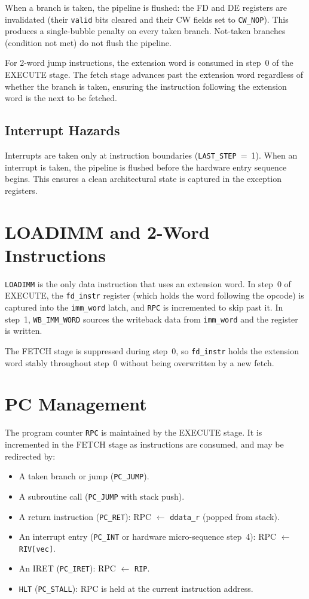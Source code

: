 \documentclass[a4paper,12pt]{report}
\newcommand{\asm}[1]{\texttt{#1}}
\newcommand{\field}[1]{\texttt{\small #1}}
\begin{document}
When a branch is taken, the pipeline is flushed: the FD and DE registers are invalidated (their \field{valid} bits cleared and their CW fields set to \field{CW\_NOP}). This produces a single-bubble penalty on every taken branch. Not-taken branches (condition not met) do not flush the pipeline.

For 2-word jump instructions, the extension word is consumed in step~0 of the EXECUTE stage. The fetch stage advances past the extension word regardless of whether the branch is taken, ensuring the instruction following the extension word is the next to be fetched.

\subsection{Interrupt Hazards}

Interrupts are taken only at instruction boundaries (\field{LAST\_STEP}~=~1). When an interrupt is taken, the pipeline is flushed before the hardware entry sequence begins. This ensures a clean architectural state is captured in the exception registers.

\section{LOADIMM and 2-Word Instructions}

\asm{LOADIMM} is the only data instruction that uses an extension word. In step~0 of EXECUTE, the \field{fd\_instr} register (which holds the word following the opcode) is captured into the \field{imm\_word} latch, and \asm{RPC} is incremented to skip past it. In step~1, \field{WB\_IMM\_WORD} sources the writeback data from \field{imm\_word} and the register is written.

The FETCH stage is suppressed during step~0, so \field{fd\_instr} holds the extension word stably throughout step~0 without being overwritten by a new fetch.

\section{PC Management}

The program counter \asm{RPC} is maintained by the EXECUTE stage. It is incremented in the FETCH stage as instructions are consumed, and may be redirected by:

\begin{itemize}
    \item A taken branch or jump (\field{PC\_JUMP}).
    \item A subroutine call (\field{PC\_JUMP} with stack push).
    \item A return instruction (\field{PC\_RET}): RPC $\leftarrow$ \field{ddata\_r} (popped from stack).
    \item An interrupt entry (\field{PC\_INT} or hardware micro-sequence step~4): RPC $\leftarrow$ \asm{RIV[vec]}.
    \item An IRET (\field{PC\_IRET}): RPC $\leftarrow$ \asm{RIP}.
    \item \asm{HLT} (\field{PC\_STALL}): RPC is held at the current instruction address.
\end{itemize}
\end{document}
